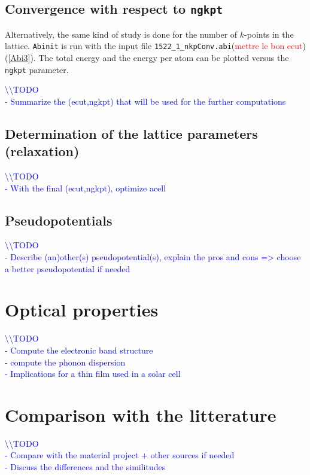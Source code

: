 \documentclass[11pt,a4paper]{article}
\begin{document}
\subsection{Convergence with respect to \texttt{ngkpt}}
Alternatively, the same kind of study is done for the number of $k$-points in the lattice. \texttt{Abinit} is run with the input file \texttt{1522\_1\_nkpConv.abi}(\textcolor{red}{mettre le bon ecut}) (\autoref{Abi3}). The total energy and the energy per atom can be plotted versus the \texttt{ngkpt} parameter.

\textcolor{blue}{
\textbackslash\textbackslash TODO\\
- Summarize the (ecut,ngkpt) that will be used for the further computations}
\subsection{Determination of the lattice parameters (relaxation)}
\textcolor{blue}{
\textbackslash\textbackslash TODO\\
- With the final (ecut,ngkpt), optimize acell}
\subsection{Pseudopotentials}
\textcolor{blue}{
\textbackslash\textbackslash TODO\\
- Describe (an)other(s) pseudopotential(s), explain the pros and cons => choose a better pseudopotential if needed}
\newpage
\section{Optical properties}
\textcolor{blue}{
\textbackslash\textbackslash TODO\\
- Compute the electronic band structure\\
- compute the phonon dispersion\\
- Implications for a thin film used in a solar cell}
\newpage
\section{Comparison with the litterature}
\textcolor{blue}{
\textbackslash\textbackslash TODO\\
- Compare with the material project + other sources if needed\\
- Discuss the differences and the similitudes}
\newpage
\end{document}
